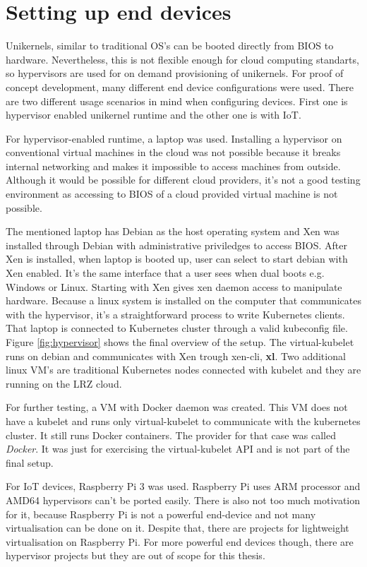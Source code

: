 
\section{Setting up end devices}
Unikernels, similar to traditional OS's can be booted directly from BIOS to hardware. Nevertheless, this is not flexible enough for cloud computing standarts, so hypervisors are used for on demand provisioning of unikernels. For proof of concept development, many different end device configurations were used. There are two different usage scenarios in mind when configuring devices. First one is hypervisor enabled unikernel runtime and the other one is with IoT.

For hypervisor-enabled runtime, a laptop was used. Installing a hypervisor on conventional virtual machines in the cloud was not possible because it breaks internal networking and makes it impossible to access machines from outside. Although it would be possible for different cloud providers, it's not a good testing environment as accessing to BIOS of a cloud provided virtual machine is not possible.

The mentioned laptop has Debian as the host operating system and Xen was installed through Debian with administrative priviledges to access BIOS. After Xen is installed, when laptop is booted up, user can select to start debian with Xen enabled. It's the same interface that a user sees when dual boots e.g. Windows or Linux. Starting with Xen gives xen daemon access to manipulate hardware. Because a linux system is installed on the computer that communicates with the hypervisor, it's a straightforward process to write Kubernetes clients. That laptop is connected to Kubernetes cluster through a valid kubeconfig file. Figure \ref{fig:hypervisor} shows the final overview of the setup. The virtual-kubelet runs on debian and communicates with Xen trough xen-cli, \textbf{xl}. Two additional linux VM's are traditional Kubernetes nodes connected with kubelet and they are running on the LRZ cloud.

For further testing, a VM with Docker daemon was created. This VM does not have a kubelet and runs only virtual-kubelet to communicate with the kubernetes cluster. It still runs Docker containers. The provider for that case was called \textit{Docker}. It was just for exercising the virtual-kubelet API and is not part of the final setup.

For IoT devices, Raspberry Pi 3 was used. Raspberry Pi uses ARM processor and AMD64 hypervisors can't be ported easily. There is also not too much motivation for it, because Raspberry Pi is not a powerful end-device and not many virtualisation can be done on it. Despite that, there are projects for lightweight virtualisation on Raspberry Pi. For more powerful end devices though, there are hypervisor projects but they are out of scope for this thesis.

